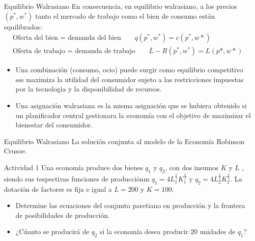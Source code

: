 \begin{frame}{Equilibrio Walrasiano}
	En consecuencia, en equilibrio walrasiano, a los precios $(p^*,w^*)$ tanto el mercado de trabajo como el bien de consumo están equilibrados:
		\begin{gather*}
			\text{Oferta del bien = demanda del bien} \qquad q(p^*,w^*) = c(p^*,w*)\\
			\text{Oferta de trabajo = demanda de trabajo} \qquad \overline{L} - R(p^*,w^*) = L(p*,w*)
		\end{gather*}
	
	\begin{itemize}
		\item 	Una combinación (consumo, ocio) puede surgir como equilibrio competitivo sss maximiza la utilidad del consumidor sujeto a las restricciones impuestas por la tecnologìa y la disponibilidad de recursos.
		\item Una asignación walrasiana es la misma asignación que se hubiera obtenido si un planificador central gestionara la economía con el objetivo de maximizar el bienestar del consumidor.
	\end{itemize}
\end{frame}
\begin{frame}{Equilibrio Walrasiano}
	La solución conjunta al modelo de la Economía Robinson Crusoe.\\
		\begin{center}
			
		\end{center}
\end{frame}
\begin{frame}{Actividad 1}
	Una economía produce dos bienes $q_1$ y $q_2$, con dos insumos $K$ y $L$ , siendo sus tespectivas funciones de producciònm $q_1=4L_{1}^{\frac{1}{4}}K_{1}^{\frac{1}{4}}$ y $q_2=4L_{2}^{\frac{1}{4}}K_{2}^{\frac{1}{4}}$. La dotación de factores es fija e igual a $L=200$ y $K=100$.
		\begin{itemize}
			\item Determine las ecuaciones del conjunto paretiano en producción y la frontera de posibilidades de producción.
			\item ¿Cúanto se producirá de $q_2$ si la economía desea producir $20$ unidades de $q_1$?
		\end{itemize}
\end{frame}
